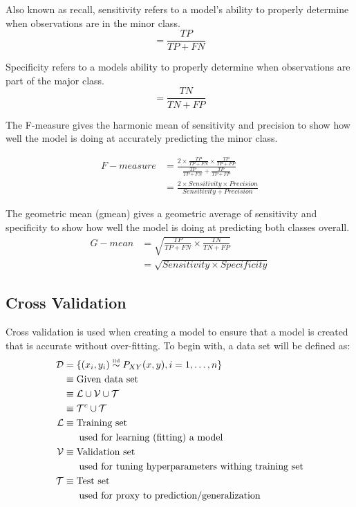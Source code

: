 \documentclass[a4paper]{article}
\begin{document}
%
%
Also known as recall, sensitivity refers to a model's ability to properly determine when observations are in the minor class.
$$=\frac{TP}{TP+FN}$$

Specificity refers to a models ability to properly determine when observations are part of the major class.
$$=\frac{TN}{TN+FP}$$

The F-measure gives the harmonic mean of sensitivity and precision to show how well the model is doing at accurately predicting the minor class.

\begin{align*}
F-measure&=\frac{2\times \frac{TP}{TP+FN}\times \frac{TP}{TP+FP}}{\frac{TP}{TP+FN}+\frac{TP}{TP+FP}}\\
&=\frac{2\times Sensitivity\times Precision}{Sensitivity+Precision}
\end{align*}

The geometric mean (gmean) gives a geometric average of sensitivity and specificity to show how well the model is doing at predicting both classes overall.
\begin{align*}
G-mean&=\sqrt{\frac{TP}{TP+FN}\times\frac{TN}{TN+FP}}\\
&=\sqrt{Sensitivity\times Specificity}
\end{align*}


\subsection{Cross Validation}
	
    Cross validation is used when creating a model to ensure that a model is created that is accurate without over-fitting. To begin with, a data set will be defined as:
\begin{align*}
\mathcal{D} &= \{(x_i,y_i)\stackrel{\mathclap{\normalfont\mbox{\tiny{iid}}}}{\sim} P_{XY}(x,y),i=1,\dots,n\}\\
&\equiv \text{Given data set}\\
&\equiv \mathcal{L} \cup \mathcal{V} \cup \mathcal{T}\\
&\equiv \mathcal{T}^c\cup\mathcal{T}\\
\mathcal{L}&\equiv\text{Training set}\\ 
&\hspace{16pt}\text{used for learning (fitting) a model}\\
\mathcal{V}&\equiv\text{Validation set}\\ 
&\hspace{16pt}\text{used for tuning hyperparameters withing training set}\\
\mathcal{T}&\equiv\text{Test set}\\ 
&\hspace{16pt}\text{used for proxy to prediction/generalization}
\end{align*}
\end{document}
